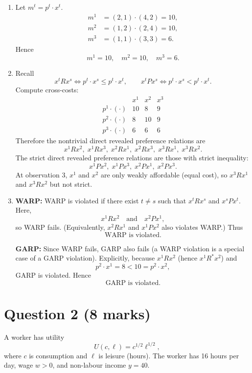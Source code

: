 \documentclass[12pt]{article}
\begin{document}
\begin{enumerate}[label=(\alph*)]
\item Let $m^t=p^t\cdot x^t$.
\[
\begin{aligned}
m^1&=(2,1)\cdot(4,2)=10,\\
m^2&=(1,2)\cdot(2,4)=10,\\
m^3&=(1,1)\cdot(3,3)=6.
\end{aligned}
\]
Hence
\[
\boxed{m^1=10,\quad m^2=10,\quad m^3=6.}
\]

\item Recall
\[
x^t R x^s \iff p^t\cdot x^s\le p^t\cdot x^t,
\qquad
x^t P x^s \iff p^t\cdot x^s< p^t\cdot x^t.
\]
Compute cross-costs:
\[
\begin{array}{c|ccc}
 & x^1 & x^2 & x^3 \\
\hline
p^1\cdot(\cdot) & 10 & 8 & 9 \\
p^2\cdot(\cdot) & 8 & 10 & 9 \\
p^3\cdot(\cdot) & 6 & 6 & 6
\end{array}
\]
Therefore the nontrivial direct revealed preference relations are
\[
\boxed{x^1 R x^2,\; x^1 R x^3,\; x^2 R x^1,\; x^2 R x^3,\; x^3 R x^1,\; x^3 R x^2.}
\]
The strict direct revealed preference relations are those with strict inequality:
\[
\boxed{x^1 P x^2,\; x^1 P x^3,\; x^2 P x^1,\; x^2 P x^3.}
\]
At observation 3, $x^1$ and $x^2$ are only weakly affordable (equal cost), so $x^3Rx^1$ and $x^3Rx^2$ but not strict.

\item \textbf{WARP:} WARP is violated if there exist $t\ne s$ such that $x^tRx^s$ and $x^sP x^t$.
Here,
\[
x^1Rx^2 \quad\text{and}\quad x^2Px^1,
\]
so WARP fails. (Equivalently, $x^2Rx^1$ and $x^1Px^2$ also violates WARP.)
Thus
\[
\boxed{\text{WARP is violated.}}
\]

\medskip
\noindent
\textbf{GARP:} Since WARP fails, GARP also fails (a WARP violation is a special case of a GARP violation). Explicitly, because $x^1Rx^2$ (hence $x^1R^*x^2$) and
\[
p^2\cdot x^1 = 8 < 10 = p^2\cdot x^2,
\]
GARP is violated.
Hence
\[
\boxed{\text{GARP is violated.}}
\]
\end{enumerate}

\bigskip

\section*{Question 2 (8 marks)}

A worker has utility
\[
U(c,\ell)=c^{1/2}\ell^{1/2},
\]
where $c$ is consumption and $\ell$ is leisure (hours). The worker has 16 hours per day, wage $w>0$, and non-labour income $y=40$.
\end{document}
